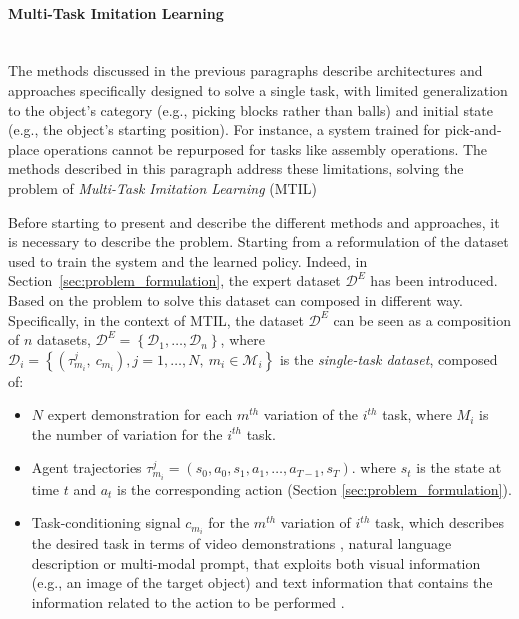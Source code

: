 \paragraph*{Multi-Task Imitation Learning}\mbox{}\\
The methods discussed in the previous paragraphs describe architectures and approaches specifically designed to solve a single task, with limited generalization to the object's category (e.g., picking blocks rather than balls) and initial state (e.g., the object's starting position). For instance, a system trained for pick-and-place operations cannot be repurposed for tasks like assembly operations. The methods described in this paragraph address these limitations, solving the problem of \textit{Multi-Task Imitation Learning} (MTIL)

Before starting to present and describe the different methods and approaches, it is necessary to describe the problem. Starting from a reformulation of the dataset used to train the system and the learned policy.
Indeed, in Section~\ref{sec:problem_formulation}, the expert dataset $\mathcal{D}^{E}$ has been introduced. Based on the problem to solve this dataset can composed in different way. Specifically, in the context of MTIL, the dataset $\mathcal{D}^{E}$ can be seen as a composition of $n$ datasets, $\mathcal{D}^{E}=\left \{\mathcal{D}_{1}, \dots, \mathcal{D}_{n}\right \}$, where $\mathcal{D}_{i} = \left \{ (\tau_{m_{i}}^{j}, \ c_{m_{i}}), j=1,\dots,N, \ m_{i} \in \mathcal{M}_{i}\right \}$ is the \textit{single-task dataset}, composed of:
\begin{itemize}
    \item $N$ expert demonstration for each $m^{th}$ variation of the $i^{th}$ task, where $M_{i}$ is the number of variation for the $i^{th}$ task.
    \item Agent trajectories $\tau_{m_{i}}^{j} = (s_{0}, a_{0}, s_{1}, a_{1}, \dots, a_{T-1}, s_{T})$. where $s_{t}$ is the state at time $t$ and $a_{t}$ is the corresponding action (Section \ref{sec:problem_formulation}).
    \item Task-conditioning signal $c_{m_{i}}$ for the $m^{th}$ variation of $i^{th}$ task, which describes the desired task in terms of video demonstrations \cite{james2018task_embedded,bhutani2022attentive_one_shot,dasari2021transformers_one_shot,mandi2022towards_more_generalizable_one_shot}, natural language description \cite{stepputtis2020language,jang2022bc_z,mees2022calvin,doasIcan2022,mees2022hulc,brohan2022rt,shridhar2023perceiver} or multi-modal prompt, that exploits both visual information (e.g., an image of the target object) and text information that contains the information related to the action to be performed \cite{jiang2023vima}.
\end{itemize}
